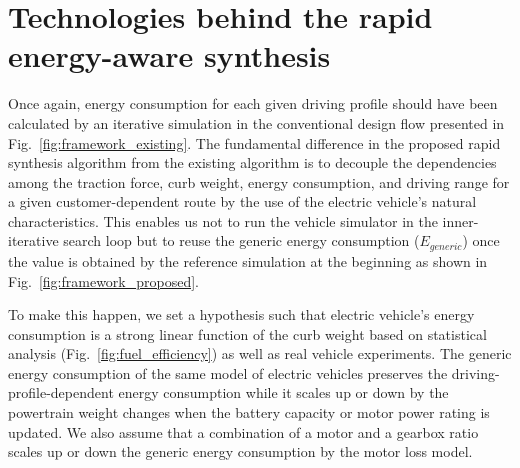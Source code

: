 \documentclass[journal]{IEEEtran}
\begin{document}
\section{Technologies behind the rapid energy-aware synthesis}


Once again, energy consumption for each given driving profile should have been calculated by an iterative simulation in the conventional design flow presented in Fig.~\ref{fig:framework_existing}. The fundamental difference in the proposed rapid synthesis algorithm from the existing algorithm is to decouple the dependencies among the traction force, curb weight, energy consumption, and driving range for a given customer-dependent route by the use of the electric vehicle's natural characteristics. This enables us not to run the vehicle simulator in the inner-iterative search loop but to reuse the generic energy consumption ($E_{generic}$) once the value is obtained by the reference simulation at the beginning as shown in Fig.~\ref{fig:framework_proposed}.  

To make this happen, we set a hypothesis such that electric vehicle's energy consumption is a strong linear function of the curb weight based on statistical analysis (Fig.~\ref{fig:fuel_efficiency}) as well as real vehicle experiments. The generic energy consumption of the same model of electric vehicles preserves the driving-profile-dependent energy consumption while it scales up or down by the powertrain weight changes when the battery capacity or motor power rating is updated. We also assume that a combination of a motor and a gearbox ratio scales up or down the generic energy consumption by the motor loss model. 
\end{document}
